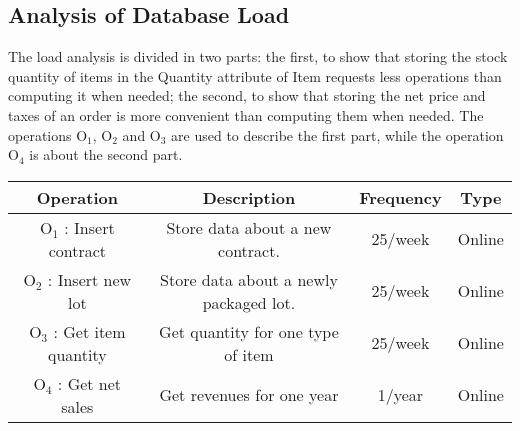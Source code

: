 \newpage
\subsection{Analysis of Database Load}
The load analysis is divided in two parts: the first, to show that storing the stock quantity of items in the Quantity attribute of Item requests less operations than computing it when needed; the second, to show that storing the net price and taxes of an order is more convenient than computing them when needed.
The operations $ \textrm{O}_\textrm{1} $, $ \textrm{O}_\textrm{2} $ and $ \textrm{O}_\textrm{3} $ are used to describe the first part, while the operation $ \textrm{O}_\textrm{4} $ is about the second part.
\begin{table}[!h]
	\begin{center}
		\begin{tabular}{ | c | c | c | c | }
			\hline
			\textbf{Operation} & \textbf{Description} & \textbf{Frequency} & \textbf{Type} \\ \hline
			$ \textrm{O}_\textrm{1} $ : Insert contract & Store data about a new contract. & 25/week & Online \\ \hline
			$ \textrm{O}_\textrm{2} $ : Insert new lot & Store data about a newly packaged lot. & 25/week & Online \\ \hline
			$ \textrm{O}_\textrm{3} $ : Get item quantity  & Get quantity for one type of item & 25/week & Online \\\hline
			$ \textrm{O}_\textrm{4} $ : Get net sales  & Get revenues for one year & 1/year & Online \\\hline
		\end{tabular}
	\end{center}
\end{table}
